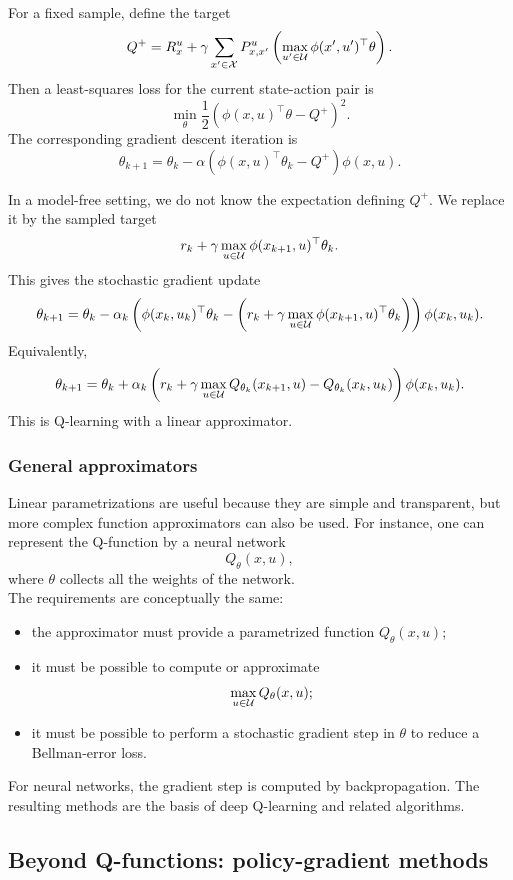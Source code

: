 For a fixed sample, define the target
\[
Q^+
=
R_x^u
+
\gamma\sum_{x'\in\mathcal{X}}P^u_{x,x'}
\left(
\max_{u'\in\mathcal{U}}\phi(x',u')^\top\theta
\right).
\]
Then a least-squares loss for the current state-action pair is
\[
\min_{\theta}
\frac{1}{2}
\left(
\phi(x,u)^\top\theta-Q^+
\right)^2.
\]
The corresponding gradient descent iteration is
\[
\theta_{k+1}
=
\theta_k
-
\alpha
\left(
\phi(x,u)^\top\theta_k-Q^+
\right)\phi(x,u).
\]

In a model-free setting, we do not know the expectation defining \(Q^+\). We replace it by the
sampled target
\[
r_k
+
\gamma\max_{u\in\mathcal{U}}\phi(x_{k+1},u)^\top\theta_k.
\]
This gives the stochastic gradient update
\[
\theta_{k+1}
=
\theta_k
-
\alpha_k
\left(
\phi(x_k,u_k)^\top\theta_k
-
\left(
r_k+\gamma\max_{u\in\mathcal{U}}\phi(x_{k+1},u)^\top\theta_k
\right)
\right)
\phi(x_k,u_k).
\]
Equivalently,
\[
\theta_{k+1}
=
\theta_k
+
\alpha_k
\left(
r_k+\gamma\max_{u\in\mathcal{U}}Q_{\theta_k}(x_{k+1},u)
-
Q_{\theta_k}(x_k,u_k)
\right)
\phi(x_k,u_k).
\]
This is Q-learning with a linear approximator.

\subsubsection{General approximators}

Linear parametrizations are useful because they are simple and transparent, but more complex
function approximators can also be used. For instance, one can represent the Q-function by a
neural network
\[
Q_\theta(x,u),
\]
where \(\theta\) collects all the weights of the network.\\
The requirements are conceptually the same:
\begin{itemize}
    \item the approximator must provide a parametrized function \(Q_\theta(x,u)\);
    \item it must be possible to compute or approximate
    \[
    \max_{u\in\mathcal{U}}Q_\theta(x,u);
    \]
    \item it must be possible to perform a stochastic gradient step in \(\theta\) to reduce a
    Bellman-error loss.
\end{itemize}
For neural networks, the gradient step is computed by backpropagation. The resulting methods
are the basis of deep Q-learning and related algorithms.

\subsection{Beyond Q-functions: policy-gradient methods}

